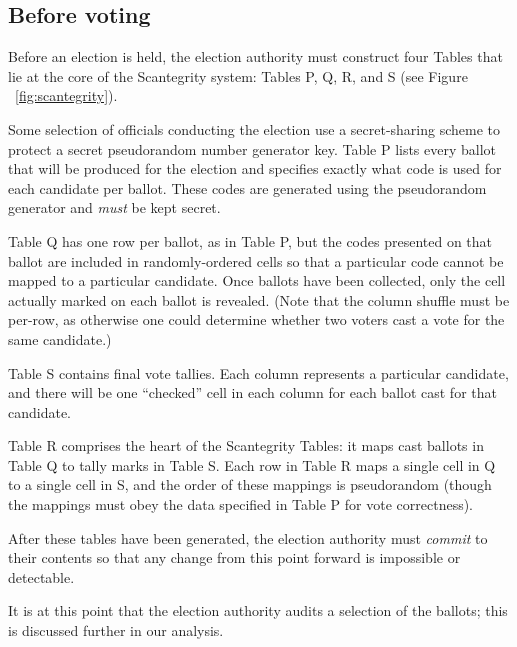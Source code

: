 \documentclass[10pt,twocolumn]{article}
\newcommand{\term}[1]{\textit{#1}}
\begin{document}
\subsection{Before voting}

Before an election is held, the election authority must construct four Tables that lie at the core
of the Scantegrity system: Tables P, Q, R, and S (see Figure ~\ref{fig:scantegrity}).

Some selection of officials conducting the election use a secret-sharing scheme to protect a
secret pseudorandom number generator key. Table P lists every ballot that will be produced for the
election and specifies exactly what code is used for each candidate per ballot. These codes are
generated using the pseudorandom generator and \emph{must} be kept secret.

Table Q has one row per ballot, as in Table P, but the codes presented on that ballot are included
in randomly-ordered cells so that a particular code cannot be mapped to a particular candidate.
Once ballots have been collected, only the cell actually marked on each ballot is revealed. (Note
that the column shuffle must be per-row, as otherwise one could determine whether two voters
cast a vote for the same candidate.)

Table S contains final vote tallies. Each column represents a particular candidate, and there will
be one ``checked'' cell in each column for each ballot cast for that candidate.

Table R comprises the heart of the Scantegrity Tables: it maps cast ballots in Table Q to tally marks
in Table S. Each row in Table R maps a single cell in Q to a single cell in S, and the order of
these mappings is pseudorandom (though the mappings must obey the data specified in Table P for vote
correctness).

After these tables have been generated, the election authority must \term{commit} to their contents
so that any change from this point forward is impossible or detectable.

It is at this point that the election authority audits a selection of the ballots; this is discussed
further in our analysis.
\end{document}
